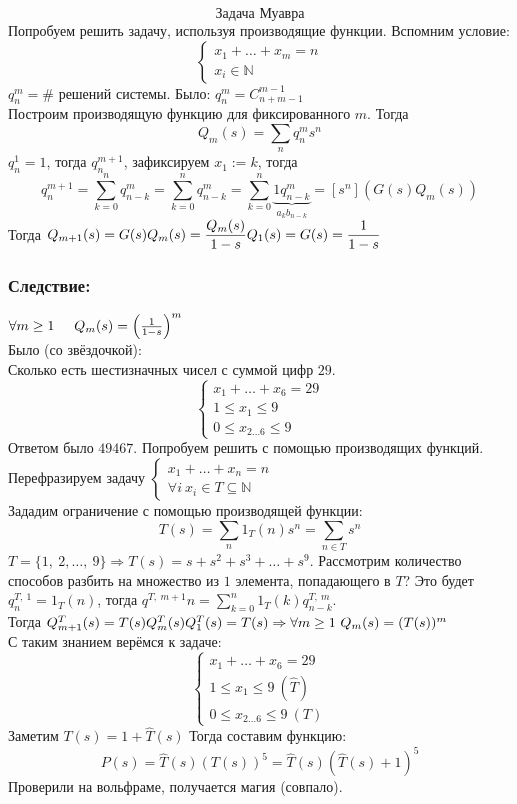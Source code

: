 \documentclass[12pt, letterpaper, twoside]{article}
\newcommand{\DS}{\displaystyle}
\begin{document}
    \[\text{Задача Муавра}\]
    Попробуем решить задачу, используя производящие функции. Вспомним условие:
    \[\begin{cases}
        x_ 1+ \dots + x_m = n\\
        x_i \in \mathbb{N}
    \end{cases}\]
    $q_n^m = \text{$\#$ решений системы}$. Было: $q_n^m = C_{n + m - 1}^{m - 1}$\\
    Построим производящую функцию для фиксированного $m$. Тогда
    \[Q_m(s) = \sum_{n} q_n^m s^n\]
    $q_n^1 = 1$, тогда $q_{n}^{m + 1}$, зафиксируем $x_1 := k$, тогда
    \[q_n^{m + 1} = \sum_{k = 0}^n q_{n - k}^m = \sum_{k = 0}^{n} q_{n - k}^m = \sum_{k = 0}^{n} \underset{a_k b_{n - k}}{\underbrace{1 q_{n - k}^{m}}} = [s^n](G(s) Q_m(s))\]
    Тогда $\DS Q_{m + 1}(s) = G(s) Q_m(s) = \frac{Q_m(s)}{1 - s}\\
    Q_1(s) = G(s) = \frac{1}{1 - s}$

    \subsubsection*{Следствие:}
    $\forall m \geq 1\hspace{0.5cm} Q_m(s) = \left( \frac{1}{1 - s} \right)^m$\\
    Было (со звёздочкой):\\
    Сколько есть шестизначных чисел с суммой цифр $29$.
    \[\begin{cases}
        x_1 + \dots + x_6 = 29\\
        1 \leq x_1 \leq 9\\
        0 \leq x_{2\dots 6} \leq 9
    \end{cases}\]
    Ответом было $49467$. Попробуем решить с помощью производящих функций.\\
    Перефразируем задачу $\begin{cases}
        x_1 + \dots + x_n = n\\
        \forall i\ x_i\in T\subseteq \mathbb{N}
    \end{cases}$\\
    Зададим ограничение с помощью производящей функции:
    \[T(s) = \DS\sum_n 1_T(n) s^n = \sum_{n\in T}s^n\]
    $T = \{1,\ 2,\dots,\ 9\}\Rightarrow T(s) = s + s^2 + s^3 + \dots + s^9$. Рассмотрим количество способов разбить на множество из $1$ элемента, попадающего в $T$?
    Это будет $q^{T,\ 1}_n = 1_T(n)$, тогда $q^{T,\ m + 1}{n} = \DS\sum_{k = 0}^{n} 1_T(k) q^{T,\ m}_{n - k}$.\\
    Тогда $Q_{m + 1}^T(s) = T(s) Q^T_m (s)\\
    Q_1^T(s) = T(s)\Rightarrow \forall m \geq 1\ Q_m(s) = (T(s))^m$\\
    С таким знанием верёмся к задаче:
    \[\begin{cases}
        x_1 + \dots + x_6 = 29\\
        1 \leq x_1 \leq 9\ (\hat{T})\\
        0 \leq x_{2\dots 6} \leq 9\ (T)
    \end{cases}\]
    Заметим $T(s) = 1 + \hat{T}(s)$
    Тогда составим функцию:
    \[P(s) = \hat{T}(s) (T(s))^5 = \hat{T}(s)(\hat{T}(s) + 1)^5\]
    Проверили на вольфраме, получается магия (совпало).
\end{document}
